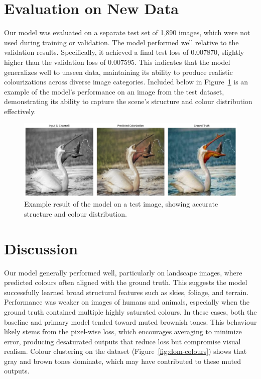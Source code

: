 \documentclass{article} %
\begin{document}
\section{Evaluation on New Data}
\label{new_data}

Our model was evaluated on a separate test set of 1,890 images, which were not used during training or validation. The model performed well relative to the validation results. Specifically, 
it achieved a final test loss of 0.007870, slightly higher than the validation loss of 0.007595. This indicates that the model generalizes well to unseen data, maintaining its ability to 
produce realistic colourizations across diverse image categories. Included below in Figure~\ref{fig:test-data-example} is an example of the model's performance on an image from the test 
dataset, demonstrating its ability to capture the scene's structure and colour distribution effectively.

\begin{figure}[htbp]
  \centering
  \includegraphics[width=0.95\linewidth]{Figs/test_data_result_example.png}
  \caption{Example result of the model on a test image, showing accurate structure and colour distribution.}
  \label{fig:test-data-example}
\end{figure}

\section{Discussion}
\label{discussion}

Our model generally performed well, particularly on landscape images, where predicted colours often aligned with the ground truth. This suggests the model successfully learned broad 
structural features such as skies, foliage, and terrain. Performance was weaker on images of humans and animals, especially when the ground truth contained multiple highly saturated 
colours. In these cases, both the baseline and primary model tended toward muted brownish tones. This behaviour likely stems from the pixel-wise loss, which encourages averaging to 
minimize error, producing desaturated outputs that reduce loss but compromise visual realism. Colour clustering on the dataset (Figure~\ref{fig:dom-colours}) shows that gray and brown 
tones dominate, which may have contributed to these muted outputs.
\end{document}
